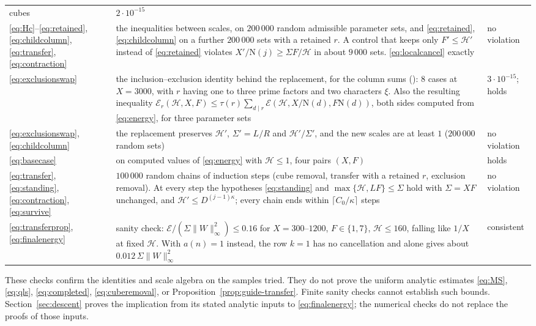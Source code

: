 \documentclass[11pt]{article}
\newcommand{\N}{\mathrm N}
\newcommand{\E}{\mathcal E}
\numberwithin{equation}{section}
\begin{document}
\begin{center}
\begin{longtable}{@{}p{2.3cm}p{8.6cm}p{3.6cm}@{}}
 cubes & $2\cdot10^{-15}$\\
\eqref{eq:Hc}--\eqref{eq:retained}, \eqref{eq:childcolumn}, \eqref{eq:transfer}, \eqref{eq:contraction}
 & the inequalities between scales, on $200\,000$ random admissible
 parameter sets, and \eqref{eq:retained}, \eqref{eq:childcolumn} on a further $200\,000$ sets with a
 retained $r$. A control that keeps only $F'\le\mathcal H'$ instead of \eqref{eq:retained} violates
 $X'/\N(j)\ge\Sigma F/\mathcal H$ in about $9\,000$ sets. \eqref{eq:localcancel} exactly & no violation\\
\eqref{eq:exclusionswap} & the inclusion--exclusion identity behind the replacement, for the column sums
 (\cite[Lemma~4.4]{original}): $8$ cases at $X=3000$, with $r$ having one to three prime factors and two
 characters $\xi$. Also the resulting inequality
 $\E_r(\mathcal H,X,F)\le\tau(r)\sum_{d\mid r}\E(\mathcal H,X/\N(d),F\N(d))$, both sides computed from
 \eqref{eq:energy}, for three parameter sets & $3\cdot10^{-15}$; holds\\
\eqref{eq:exclusionswap}, \eqref{eq:childcolumn} & the replacement preserves $\mathcal H'$, $\Sigma'=L/R$
 and $\mathcal H'/\Sigma'$, and the new scales are at least $1$ ($200\,000$ random sets) & no violation\\
\eqref{eq:basecase} & on computed values of \eqref{eq:energy} with $\mathcal H\le1$, four pairs $(X,F)$ & holds\\
\eqref{eq:transfer}, \eqref{eq:standing}, \eqref{eq:contraction}, \eqref{eq:survive} & $100\,000$ random
 chains of induction steps (cube removal, transfer with a retained $r$, exclusion removal). At every step the
 hypotheses \eqref{eq:standing} and $\max\{\mathcal H,LF\}\le\Sigma$ hold with $\Sigma=XF$ unchanged, and
 $\mathcal H'\le D^{(j-1)\kappa}$; every chain ends within $\lceil C_0/\kappa\rceil$ steps & no violation\\
\eqref{eq:transferprop}, \eqref{eq:finalenergy} & sanity check: $\E/(\Sigma\|W\|_\infty^2)\le0.16$ for
 $X=300$--$1200$, $F\in\{1,7\}$, $\mathcal H\le160$, falling like $1/X$ at fixed $\mathcal H$. With
 $a(n)=1$ instead, the row $k=1$ has no cancellation and alone gives about $0.012\,\Sigma\|W\|_\infty^2$
 & consistent\\
\bottomrule
\end{longtable}
\end{center}

These checks confirm the identities and scale algebra on the samples tried.
They do not prove the uniform analytic estimates \eqref{eq:MS},
\eqref{eq:qls}, \eqref{eq:completed}, \eqref{eq:cuberemoval}, or
Proposition~\ref{prop:guide-transfer}. Finite sanity checks cannot
establish such bounds. Section~\ref{sec:descent} proves the implication
from its stated analytic inputs to \eqref{eq:finalenergy}; the
numerical checks do not replace the proofs of those inputs.
\end{document}
